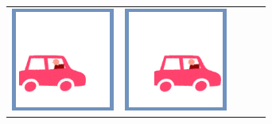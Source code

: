 \documentclass[12pt]{article}
\begin{document}
\begin{minipage}{\textwidth}
\begin{table}[H]
\begin{tabulary}{\linewidth}{|C|CCCC|}
				\vspace{0.01cm}\includegraphics[width=\linewidth]{option2} &
				\vspace{0.01cm}\includegraphics[width=\linewidth]{option3} &

\end{tabulary}
\end{table}
\end{minipage}
\end{document}
